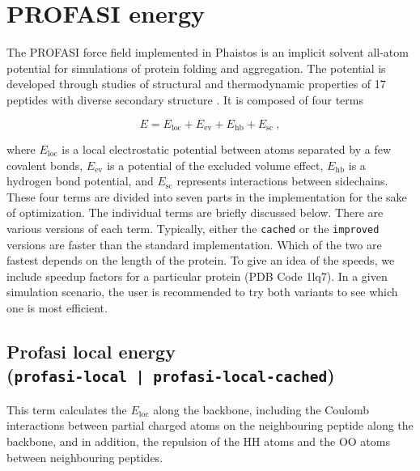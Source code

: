 
\section{PROFASI energy}
\label{sec:profasi-energy}

The PROFASI force field implemented in Phaistos is an implicit solvent
all-atom potential for simulations of protein folding and
aggregation. The potential is developed through studies of structural
and thermodynamic properties of 17 peptides with diverse secondary
structure \cite{irback2009effective}. It is composed of four terms

\begin{equation}
E = E_{\mathrm{loc}} + E_{\mathrm{ev}} + E_{\mathrm{hb}} + E_{\mathrm{sc}} \ ,
\end{equation}

\noindent
where $E_{\mathrm{loc}}$ is a local electrostatic potential between atoms
separated by a few covalent bonds, $E_{\mathrm{ev}}$ is a potential of the
excluded volume effect, $E_{\mathrm{hb}}$ is a hydrogen bond potential,
and $E_{\mathrm{sc}}$ represents interactions between sidechains. These four
terms are divided into seven parts in the implementation for the sake
of optimization. The individual terms are briefly discussed
below. There are various versions of each term. Typically, either the
\texttt{cached} or the \texttt{improved} versions are faster than the
standard implementation. Which of the two are fastest depends on the
length of the protein. To give an idea of the speeds, we include
speedup factors for a particular protein (PDB Code 1lq7). In a given
simulation scenario, the user is recommended to try both variants to
see which one is most efficient.







\subsection{Profasi local energy \\(\texttt{profasi-local | profasi-local-cached})}
This term calculates the $E_{\mathrm{loc}}$ along the backbone,
including the Coulomb interactions between partial charged atoms on
the neighbouring peptide along the backbone, and in addition, the
repulsion of the HH atoms and the OO atoms between neighbouring
peptides.

